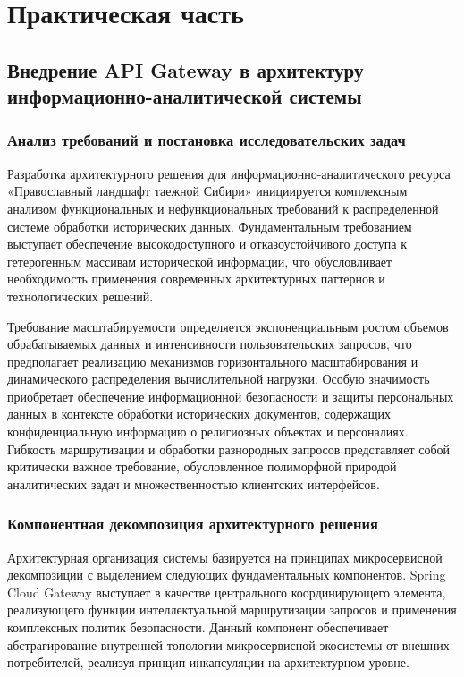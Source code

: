 \chapter{Практическая часть}


\section{Внедрение API Gateway в архитектуру информационно-аналитической системы}

\subsection{Анализ требований и постановка исследовательских задач}

Разработка архитектурного решения для информационно-аналитического ресурса «Православный ландшафт таежной Сибири» инициируется комплексным анализом функциональных и нефункциональных требований к распределенной системе обработки исторических данных. Фундаментальным требованием выступает обеспечение высокодоступного и отказоустойчивого доступа к гетерогенным массивам исторической информации, что обусловливает необходимость применения современных архитектурных паттернов и технологических решений.

Требование масштабируемости определяется экспоненциальным ростом объемов обрабатываемых данных и интенсивности пользовательских запросов, что предполагает реализацию механизмов горизонтального масштабирования и динамического распределения вычислительной нагрузки. Особую значимость приобретает обеспечение информационной безопасности и защиты персональных данных в контексте обработки исторических документов, содержащих конфиденциальную информацию о религиозных объектах и персоналиях. Гибкость маршрутизации и обработки разнородных запросов представляет собой критически важное требование, обусловленное полиморфной природой аналитических задач и множественностью клиентских интерфейсов.

\subsection{Компонентная декомпозиция архитектурного решения}

Архитектурная организация системы базируется на принципах микросервисной декомпозиции с выделением следующих фундаментальных компонентов. Spring Cloud Gateway выступает в качестве центрального координирующего элемента, реализующего функции интеллектуальной маршрутизации запросов и применения комплексных политик безопасности. Данный компонент обеспечивает абстрагирование внутренней топологии микросервисной экосистемы от внешних потребителей, реализуя принцип инкапсуляции на архитектурном уровне.

